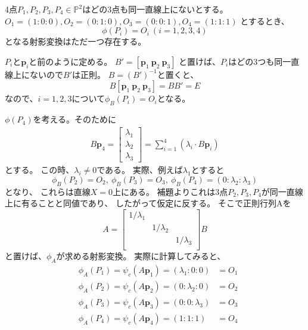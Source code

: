 \documentclass[a4]{article}
\newcommand{\proj}{\mathbb{P}}
\begin{document}
    \begin{Prop}
        4点$P_1, P_2, P_3, P_4 \in \proj^2$はどの3点も同一直線上にないとする。
        $O_1=(1:0:0), O_2=(0:1:0), O_3=(0:0:1), O_4=(1:1:1)$
        とするとき、
        \[ \phi(P_i)=O_i ~(i=1,2,3,4)\]
        となる射影変換はただ一つ存在する。
    \end{Prop}
    \begin{Proof}
        $P_i$と$\mathbf{p}_i$と前のように定める。
        $B'=[\mathbf{p}_1~\mathbf{p}_2~\mathbf{p}_3]$
        と置けば、$P_i$はどの3つも同一直線上にないので$B'$は正則。
        $B=(B')^{-1}$と置くと、
        \[ B[\mathbf{p}_1~\mathbf{p}_2~\mathbf{p}_3]=B B'=E \]
        なので、$i=1,2,3$について$\phi_B(P_i)=O_i$となる。

        $\phi(P_4)$を考える。そのために
        \begin{gather}
        B \mathbf{p}_4=
        \begin{bmatrix}
            \lambda_1 \\ \lambda_2 \\ \lambda_3
        \end{bmatrix}
        =\sum_{i=1}^{4}{(\lambda_i \cdot B \mathbf{p}_i)} \label{astarisk}
        \end{gather}
        とする。
        この時、$\lambda_i \neq 0$である。
        実際、例えば$\lambda_1$とすると
        \[ \phi_B(P_2)=O_2,~ \phi_B(P_3)=O_3,~ \phi_B(P_4)=(0:\lambda_2:\lambda_3) \]となり、
        これらは直線$X=0$上にある。
        補題よりこれは3点$P_2, P_3,P_4$が同一直線上に有ることと同値であり、
        したがって仮定に反する。
        そこで正則行列Aを
        \[
        A=
        \begin{bmatrix}
            1/\lambda_1& {}& {} \\
            {}& 1/\lambda_2& {} \\
            {}& {}& 1/\lambda_3 \\
        \end{bmatrix}
        B
        \]
        と置けば、$\phi_A$が求める射影変換。
        実際に計算してみると、
        \begin{eqnarray*}
            &\phi_A(P_1)=\psi_{c}(A \mathbf{p}_1)=(\lambda_1:0:0)&=O_1 \\
            &\phi_A(P_2)=\psi_{c}(A \mathbf{p}_2)=(0:\lambda_2:0)&=O_2 \\
            &\phi_A(P_3)=\psi_{c}(A \mathbf{p}_3)=(0:0:\lambda_3)&=O_3 \\
            &\phi_A(P_4)=\psi_{c}(A \mathbf{p}_4)=(1 : 1: 1)    ~&=O_4
        \end{eqnarray*}


\end{Proof}
\end{document}
